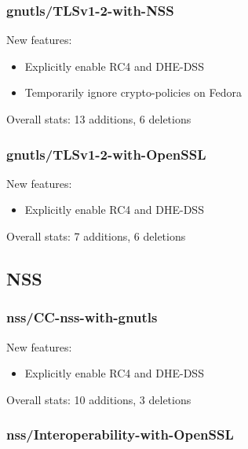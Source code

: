 \subsubsection{gnutls/TLSv1-2-with-NSS}
    New features:
    \begin{itemize}
        \item Explicitly enable RC4 and DHE-DSS
        \item Temporarily ignore crypto-policies on Fedora
    \end{itemize}

    \noindent Overall stats: 13 additions, 6 deletions

\subsubsection{gnutls/TLSv1-2-with-OpenSSL}
    New features:
    \begin{itemize}
        \item Explicitly enable RC4 and DHE-DSS
    \end{itemize}

    \noindent Overall stats: 7 additions, 6 deletions

\subsection{NSS}
\subsubsection{nss/CC-nss-with-gnutls}
    New features:
    \begin{itemize}
        \item Explicitly enable RC4 and DHE-DSS
    \end{itemize}

    \noindent Overall stats: 10 additions, 3 deletions

\subsubsection{nss/Interoperability-with-OpenSSL}

